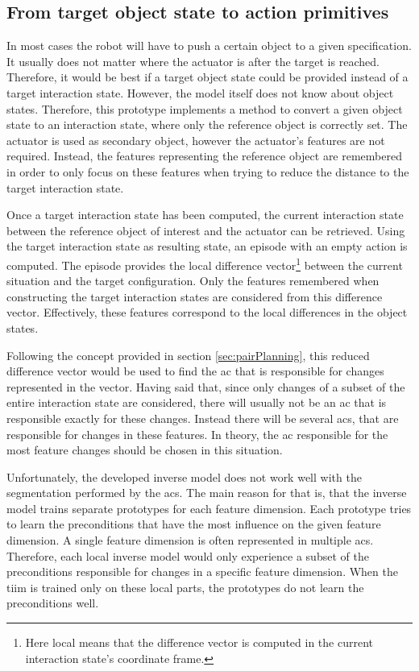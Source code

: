 \subsection{From target object state to action primitives\label{sec:pairPlanningReal}}

In most cases the robot will have to push a certain object to a given specification. It usually does not matter where the actuator is after the target is reached. Therefore, it would be best if a target object state could be provided instead of a target interaction state. However, the model itself does not know about object states. Therefore, this prototype implements a method to convert a given object state to an interaction state, where only the reference object is correctly set. The actuator is used as secondary object, however the actuator's features are not required. Instead, the features representing the reference object are remembered in order to only focus on these features when trying to reduce the distance to the target interaction state. 

Once a target interaction state has been computed, the current interaction state between the reference object of interest and the actuator can be retrieved. Using the target interaction state as resulting state, an episode with an empty action is computed. The episode provides the local difference vector\footnote{Here local means that the difference vector is computed in the current interaction state's coordinate frame.} between the current situation and the target configuration. Only the features remembered when constructing the target interaction states are considered from this difference vector. Effectively, these features correspond to the local differences in the object states. 

Following the concept provided in section \ref{sec:pairPlanning}, this reduced difference vector would be used to find the \gls{ac} that is responsible for changes represented in the vector.
Having said that, since only changes of a subset of the entire interaction state are considered, there will usually not be an \gls{ac} that is responsible exactly for these changes. 
Instead there will be several \glspl{ac}, that are responsible for changes in these features. In theory, the \gls{ac} responsible for the most feature changes should be chosen in this situation. 

Unfortunately, the developed inverse model does not work well with the segmentation performed by the \glspl{ac}. The main reason for that is, that the inverse model trains separate prototypes for each feature dimension.
Each prototype tries to learn the preconditions that have the most influence on the given feature dimension. A single feature dimension is often represented in multiple \glspl{ac}. Therefore, each local inverse model would only experience a subset of the preconditions responsible for changes in a specific feature dimension. When the \gls{tiim} is trained only on these local parts, the prototypes do not learn the preconditions well.


